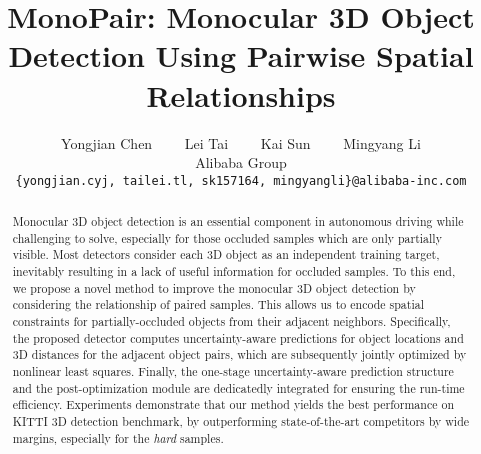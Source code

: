 \documentclass[10pt,twocolumn,letterpaper]{article}
\begin{document}
\title{MonoPair: Monocular 3D Object Detection Using Pairwise Spatial Relationships}


\author{
    Yongjian Chen \ \ \ \
    Lei Tai \ \ \ \
    Kai Sun \ \ \ \
    Mingyang Li\\
    Alibaba Group\\
{\tt\small \{yongjian.cyj, tailei.tl, sk157164, mingyangli\}@alibaba-inc.com}
}

\maketitle




\begin{abstract}

Monocular 3D object detection is an essential component in autonomous driving while challenging to solve, especially for those occluded samples which are only partially visible.
Most detectors consider each 3D object as an independent training target,
inevitably resulting in a lack of useful information for occluded samples.
To this end, we propose a novel method to improve the monocular 3D object detection by considering the relationship of paired samples.
This allows us to encode spatial constraints for
partially-occluded objects from their adjacent neighbors.
Specifically, the proposed detector computes uncertainty-aware predictions for object locations and 3D distances for the adjacent object pairs,
which are subsequently jointly optimized by nonlinear least squares.
Finally, the one-stage uncertainty-aware prediction structure and the post-optimization module are dedicatedly integrated for ensuring the run-time efficiency.
Experiments demonstrate that our method yields the best performance on KITTI 3D detection benchmark, by outperforming state-of-the-art competitors by wide margins, especially for the  \textit{hard} samples.
\end{abstract}
\end{document}
